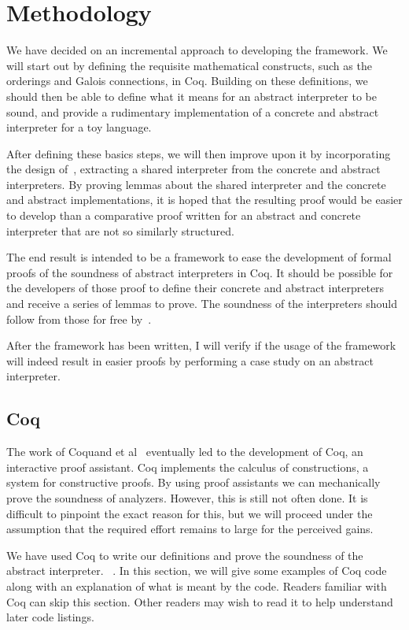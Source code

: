 \section{Methodology}
We have decided on an incremental approach to developing the framework. We will
start out by defining the requisite mathematical constructs, such as the
orderings and Galois connections, in Coq. Building on these definitions, we
should then be able to define what it means for an abstract interpreter to be
sound, and provide a rudimentary implementation of a concrete and abstract
interpreter for a toy language.

After defining these basics steps, we will then improve upon it by incorporating
the design of~\cite{keidel2018compositional}, extracting a shared interpreter
from the concrete and abstract interpreters. By proving lemmas about the
shared interpreter and the concrete and abstract implementations, it is hoped
that the resulting proof would be easier to develop than a comparative proof
written for an abstract and concrete interpreter that are not so similarly
structured.

The end result is intended to be a framework to ease the development of formal
proofs of the soundness of abstract interpreters in Coq. It should be possible
for the developers of those proof to define their concrete and abstract
interpreters and receive a series of lemmas to prove. The soundness of the
interpreters should follow from those for free 
by~\cite{keidel2018compositional}.

After the framework has been written, I will verify if the usage of the
framework will indeed result in easier proofs by performing a case study on an
abstract interpreter.

\subsection{Coq}
The work of Coquand et al~\cite{coquand1986calculus} eventually led to the
development of Coq, an interactive proof assistant. Coq implements the calculus
of constructions, a system for constructive proofs. By using proof assistants 
we can mechanically prove the soundness of analyzers. 
However, this is still not often done. It is difficult to
pinpoint the exact reason for this, but we will proceed under the assumption
that the required effort remains to large for the perceived gains. 

We have used Coq to write our definitions and
prove the soundness of the abstract interpreter. ~\cite{coqintroduction}.
In this section, we will give some examples of Coq code along with an
explanation of what is meant by the code. Readers familiar with Coq can skip
this section. Other readers may wish to read it to help understand later code
listings.

